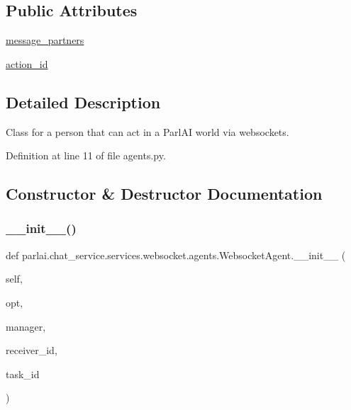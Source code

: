 \subsection*{Public Attributes}
\begin{DoxyCompactItemize}
\item 
\hyperlink{classparlai_1_1chat__service_1_1services_1_1websocket_1_1agents_1_1WebsocketAgent_acdde68c9a11ff8d7cbc968d26f166061}{message\+\_\+partners}
\item 
\hyperlink{classparlai_1_1chat__service_1_1services_1_1websocket_1_1agents_1_1WebsocketAgent_a013ba8209bd78bec4b657f422371d81e}{action\+\_\+id}
\end{DoxyCompactItemize}


\subsection{Detailed Description}
\begin{DoxyVerb}Class for a person that can act in a ParlAI world via websockets.
\end{DoxyVerb}
 

Definition at line 11 of file agents.\+py.



\subsection{Constructor \& Destructor Documentation}
\mbox{\label{classparlai_1_1chat__service_1_1services_1_1websocket_1_1agents_1_1WebsocketAgent_a128d5ee9aaa2861274d95778b75dda16}} 
\subsubsection{\texorpdfstring{\+\_\+\+\_\+init\+\_\+\+\_\+()}{\_\_init\_\_()}}
{\footnotesize\ttfamily def parlai.\+chat\+\_\+service.\+services.\+websocket.\+agents.\+Websocket\+Agent.\+\_\+\+\_\+init\+\_\+\+\_\+ (\begin{DoxyParamCaption}\item[{}]{self,  }\item[{}]{opt,  }\item[{}]{manager,  }\item[{}]{receiver\+\_\+id,  }\item[{}]{task\+\_\+id }\end{DoxyParamCaption})}



